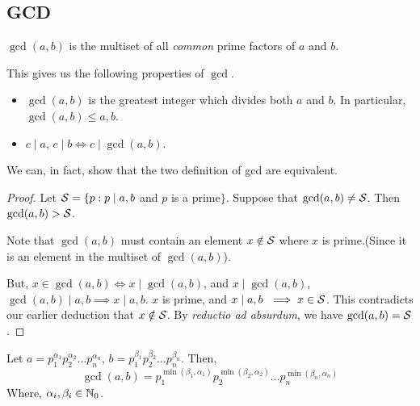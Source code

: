 \subsection{GCD}

\begin{definition}
    \( \gcd(a,b)\) is the multiset of all \textit{common} prime factors of \(a\) and \(b\).
\end{definition}

This gives us the following properties of \(\gcd\).

\begin{proposition}
    \hfill
    \begin{itemize}
        \item \(\gcd(a,b)\) is the greatest integer which divides both \(a\) and \(b\). In particular, \(\gcd(a,b) \le a, b\).
        \item \(c \mid a\), \(c \mid b \iff c \mid \gcd(a,b)\).
    \end{itemize}
\end{proposition}

We can, in fact, show that the two definition of gcd are equivalent. 

\begin{proof}
    Let \( \mathcal{S} = \{p : p \mid a, b \) and \(p \) is a prime\( \} \). Suppose that \(\gcd(a,b) \ne \mathcal{S} \). Then \( \gcd(a,b) > \mathcal{S} \). 

    Note that \( \gcd(a,b)\) must contain an element \(x \notin \mathcal{S} \) where \(x\) is prime.(Since it is an element in the multiset of \(\gcd(a,b)\)). 

    But, \(x \in \gcd(a,b) \iff x \mid \gcd(a,b)\), and \(x \mid \gcd(a,b) \), \(\gcd(a,b) \mid a, b \implies x \mid a,b\). \(x\) is prime, and \(x \mid a,b\ \implies x \in \mathcal{S}\). This contradicts our earlier deduction that \(x \notin \mathcal{S}\). By \textit{reductio ad absurdum}, we have \(\gcd(a,b) = \mathcal{S} \).
\end{proof}

\begin{claim}
    
    Let \(a = p_{1} ^{\alpha_1} p_{2} ^{\alpha_2} \ldots p_{n}^{\alpha_n}\), \(b = p_{1} ^{\beta_1} p_{2} ^{\beta_2} \ldots p_{n}^{\beta_n}\). Then, \[\gcd(a,b)= p_{1} ^{\min(\beta_1, \alpha_1)} p_{2} ^{\min(\beta_2, \alpha_2)} \ldots p_{n}^{\min(\beta_n, \alpha_n)} \]
    Where, \(\alpha_i, \beta_i \in \mathbb N_0 \).
    
\end{claim}

